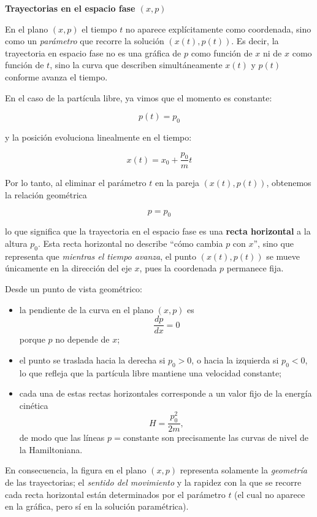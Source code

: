 \documentclass{article}
\begin{document}
\vspace{0.3cm}
\textcolor{trueblue}{\textbf{Trayectorias en el espacio fase $(x,p)$}}

En el plano $(x,p)$ el tiempo $t$ no aparece explícitamente como coordenada, sino
como un \emph{parámetro} que recorre la solución $(x(t),p(t))$.  
Es decir, la trayectoria en espacio fase no es una gráfica de $p$ como función de $x$
ni de $x$ como función de $t$, sino la curva que describen simultáneamente
$x(t)$ y $p(t)$ conforme avanza el tiempo.

En el caso de la partícula libre, ya vimos que el momento es constante:

\[
p(t) = p_{0}
\]

y la posición evoluciona linealmente en el tiempo:

\[
x(t) = x_{0} + \frac{p_{0}}{m}t
\]

Por lo tanto, al eliminar el parámetro $t$ en la pareja $(x(t),p(t))$, obtenemos la
relación geométrica

\[
p = p_{0}
\]

lo que significa que la trayectoria en el espacio fase es una \textbf{recta horizontal}
a la altura $p_{0}$.  
Esta recta horizontal no describe “cómo cambia $p$ con $x$”, sino que representa que
\emph{mientras el tiempo avanza}, el punto $(x(t),p(t))$ se mueve únicamente en la
dirección del eje $x$, pues la coordenada $p$ permanece fija.

Desde un punto de vista geométrico:

\begin{itemize}
  \item[$\bullet$] la pendiente de la curva en el plano $(x,p)$ es
  \[
    \frac{dp}{dx} = 0
  \]
  porque $p$ no depende de $x$;
  
  \item[$\bullet$] el punto se traslada hacia la derecha si $p_{0}>0$, o hacia la izquierda
  si $p_{0}<0$, lo que refleja que la partícula libre mantiene una velocidad constante;

  \item[$\bullet$] cada una de estas rectas horizontales corresponde a un valor fijo de la
  energía cinética
  \[
    H = \frac{p_{0}^{2}}{2m},
  \]
  de modo que las líneas $p=\text{constante}$ son precisamente las curvas de nivel de la
  Hamiltoniana.
\end{itemize}

En consecuencia, la figura en el plano $(x,p)$ representa solamente la \emph{geometría}
de las trayectorias; el \emph{sentido del movimiento} y la rapidez con la que se recorre
cada recta horizontal están determinados por el parámetro $t$ (el cual no aparece en la
gráfica, pero sí en la solución paramétrica).
\end{document}
